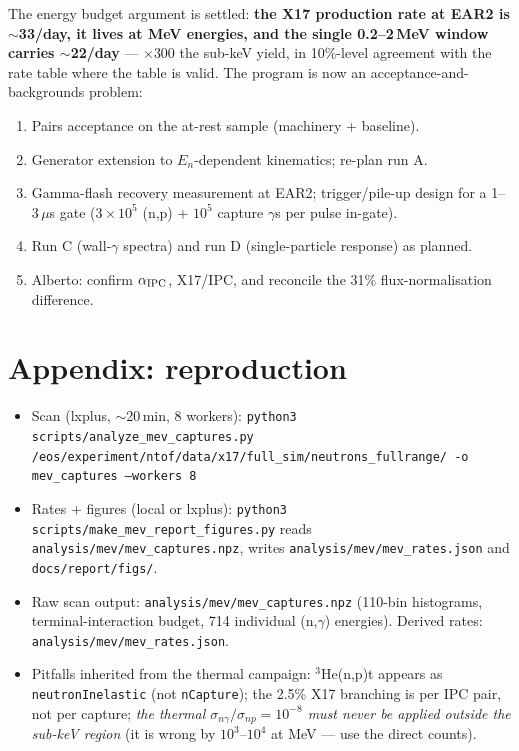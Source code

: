 \documentclass[11pt,a4paper]{article}
\newcommand{\He}[1]{$^{#1}$He}
\newcommand{\snp}{\sigma_{np}}
\newcommand{\sng}{\sigma_{n\gamma}}
\begin{document}
The energy budget argument is settled: \textbf{the X17 production rate at
EAR2 is $\sim$33/day, it lives at MeV energies, and the single 0.2--2\,MeV
window carries $\sim$22/day} --- $\times$300 the sub-keV yield, in
10\%-level agreement with the rate table where the table is valid. The
program is now an acceptance-and-backgrounds problem:

\begin{enumerate}
  \item Pairs acceptance on the at-rest sample (machinery + baseline).
  \item Generator extension to $E_n$-dependent kinematics; re-plan run A.
  \item Gamma-flash recovery measurement at EAR2; trigger/pile-up design
    for a 1--3\,$\mu$s gate ($3\times10^{5}$ (n,p) + $10^{5}$ capture
    $\gamma$s per pulse in-gate).
  \item Run C (wall-$\gamma$ spectra) and run D (single-particle response)
    as planned.
  \item Alberto: confirm $\alpha_{\rm IPC}$, X17/IPC, and reconcile the
    31\% flux-normalisation difference.
\end{enumerate}

\appendix
\section*{Appendix: reproduction}

\begin{itemize}
  \item Scan (lxplus, $\sim$20\,min, 8 workers):
    \texttt{python3 scripts/analyze\_mev\_captures.py
    /eos/experiment/ntof/data/x17/full\_sim/neutrons\_fullrange/ -o
    mev\_captures --workers 8}
  \item Rates + figures (local or lxplus):
    \texttt{python3 scripts/make\_mev\_report\_figures.py} reads
    \texttt{analysis/mev/mev\_captures.npz}, writes
    \texttt{analysis/mev/mev\_rates.json} and \texttt{docs/report/figs/}.
  \item Raw scan output: \texttt{analysis/mev/mev\_captures.npz}
    (110-bin histograms, terminal-interaction budget, 714 individual
    (n,$\gamma$) energies). Derived rates: \texttt{analysis/mev/mev\_rates.json}.
  \item Pitfalls inherited from the thermal campaign: \He{3}(n,p)t appears
    as \texttt{neutronInelastic} (not \texttt{nCapture}); the 2.5\% X17
    branching is per IPC pair, not per capture; \emph{the thermal
    $\sng/\snp = 10^{-8}$ must never be applied outside the sub-keV region}
    (it is wrong by $10^{3}$--$10^{4}$ at MeV --- use the direct counts).
\end{itemize}
\end{document}
